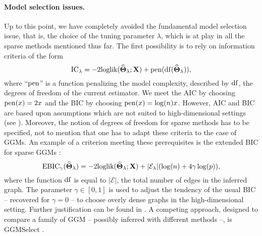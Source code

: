 
\paragraph*{Model  selection  issues.}   Up  to this  point,  we  have
completely avoided the fundamental model selection issue, that is, the
choice of the tuning parameter $\lambda$,  which is at play in all the
sparse methods mentioned  thus far.  The first possibility  is to rely
on information criteria of the form
\begin{equation*}
  \textrm{IC}_\lambda = - 2 \textrm{loglik}(\widehat{\boldsymbol\Theta}_\lambda;\mathbf{X}) + \mathrm{pen}(\mathrm{df}(\widehat{\boldsymbol\Theta}_\lambda)),
\end{equation*}
where  ``$\mathrm{pen}$''  is  a  function penalizing  the  model  complexity,
described by $\mathrm{df}$,  the degrees of freedom of  the current estimator.
We meet the AIC  by choosing $\mathrm{pen}(x) = 2 x $ and  the BIC by choosing
$\mathrm{pen}(x)  =  \log(n)  x$.   However,   AIC  and  BIC  are  based  upon
assumptions  which are  not suited  to high-dimensional  settings (see
\cite{2012_SS_Giraud}).  Moreover,  the notion  of degrees  of freedom
for sparse methods has to be specified, not to mention that one has to
adapt these criteria  to the case of GGMs.  An  example of a criterion
meeting  these  prerequisites is  the  extended  BIC for  sparse  GGMs
\cite{foygel2010extended}:
\begin{equation}
  \label{eq:EBIC_ggm}
  \text{EBIC}_\gamma(\widehat{\invcov}_\lambda)  =   -2 \textrm{loglik}
  (\widehat{\invcov}_\lambda;\bX) + |\mathcal{E}_\lambda| (\log(n) + 4 \gamma \log(p) ),
\end{equation}
where the function $\mathrm{df}$ is equal to $|\mathcal{E}|$, the total number
of edges  in the  inferred graph. The  parameter $\gamma\in  [0,1]$ is
used  to  adjust the  tendency  of  the  usual  BIC --  recovered  for
$\gamma=0$ --  to choose overly  dense graphs in  the high-dimensional
setting.      Further     justification     can    be     found     in
\cite{foygel2010extended}. A competing approach, designed to compare a
family  of GGM  -- possibly  inferred  with different  methods --,  is
GGMSelect \cite{2012_SAGMB_Giraud,giraud2008estimation}.

